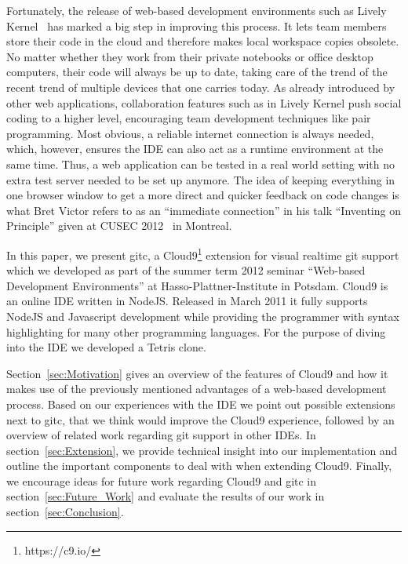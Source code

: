 Fortunately, the release of web-based development environments such as Lively Kernel~\cite{Ingalls2008LKS}
has marked a big step in improving this process.
It lets team members store their code in the cloud and therefore makes local workspace copies obsolete.
No matter whether they work from their private notebooks or office desktop computers, their code will always be up to date,
taking care of the trend of the recent trend of multiple devices that one carries today.
As already introduced by other web applications, collaboration features such as in Lively Kernel push social coding
to a higher level, encouraging team development techniques like pair programming.
Most obvious, a reliable internet connection is always needed, which, however, ensures the IDE can also act as a runtime environment at the same time.
Thus, a web application can be tested in a real world setting with no extra test server needed to be set up anymore.
The idea of keeping everything in one browser window to get a more direct and quicker feedback on code changes is
what Bret Victor refers to as an ``immediate connection'' in his talk ``Inventing on Principle'' given at
CUSEC 2012~\cite{victor2012inventing} in Montreal.

In this paper, we present gitc, a Cloud9\footnote{https://c9.io/} extension for visual realtime git support which we developed as part of the
summer term 2012 seminar ``Web-based Development Environments'' at Hasso-Plattner-Institute in Potsdam.
Cloud9 is an online IDE written in NodeJS. Released in March 2011 it fully supports NodeJS and Javascript development
while providing the programmer with syntax highlighting for many other programming languages.
For the purpose of diving into the IDE we developed a Tetris clone.


Section~\ref{sec:Motivation} gives an overview of the features of Cloud9 and how it makes use of the
previously mentioned advantages of a web-based development process.
Based on our experiences with the IDE we point out possible extensions next to gitc, that we think would improve
the Cloud9 experience, followed by an overview of related work regarding git support in other IDEs.
In section~\ref{sec:Extension}, we provide technical insight into our implementation and outline the important
components to deal with when extending Cloud9.
Finally, we encourage ideas for future work regarding Cloud9 and gitc in section~\ref{sec:Future_Work} and
evaluate the results of our work in section~\ref{sec:Conclusion}.